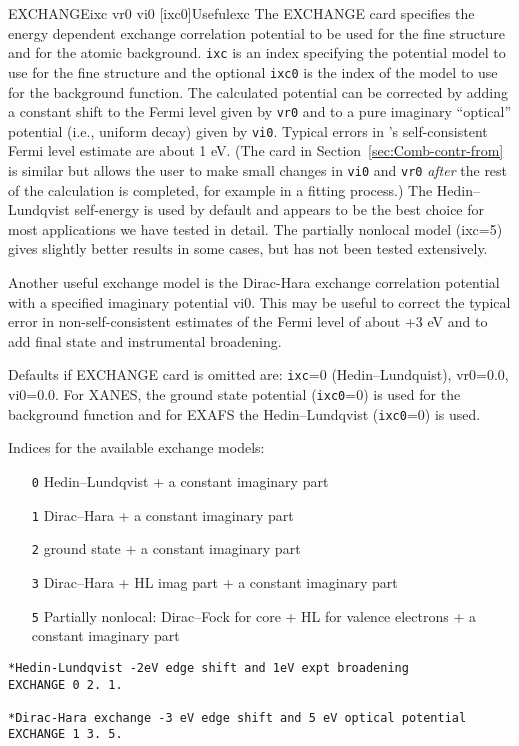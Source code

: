\documentclass[11pt,oneside]{report} %
\begin{document}
\begin{Card}{EXCHANGE}{ixc vr0 vi0 [ixc0]}{Useful}{exc}
  The EXCHANGE card specifies the energy dependent exchange
  correlation potential to be used for the fine structure and for the
  atomic background.  \texttt{ixc} is an index specifying the
  potential model to use for the fine structure and the optional
  \texttt{ixc0} is the index of the model to use for the background
  function.  The calculated potential can be corrected by adding a
  constant shift to the Fermi level given by \texttt{vr0} and to a
  pure imaginary ``optical'' potential (i.e., uniform decay)
  given by \texttt{vi0}. Typical errors in {\feff}'s self-consistent
  Fermi level estimate are about 1 eV.  (The
   card in Section~\ref{sec:Comb-contr-from} is
  similar but allows the user to make small changes in \texttt{vi0}
  and \texttt{vr0} {\it after}  the rest of the calculation is completed,
  for example in a fitting process.)  The
  Hedin--Lundqvist self-energy is used by default and appears to be the
  best choice for most applications we have tested in detail.  The
  partially nonlocal model (ixc=5) gives slightly better results in some
  cases, but has not been tested extensively.

  Another useful exchange model is the Dirac-Hara exchange correlation
  potential with a specified imaginary potential vi0.  This may be
  useful to correct the typical error in non-self-consistent estimates of
  the Fermi level of about +3 eV and to add final state and
  instrumental broadening.

  Defaults if EXCHANGE card is omitted are: \texttt{ixc}=0
  (Hedin--Lundquist), vr0=0.0, vi0=0.0.  For XANES, the ground state
  potential (\texttt{ixc0}=0) is used for the background function and
  for EXAFS the Hedin--Lundqvist (\texttt{ixc0}=0) is used.

  Indices for the available exchange models:
  \begin{itemize}
    \tightlist
  \item[ \texttt{0}\quad] Hedin--Lundqvist + a constant imaginary part
  \item[ \texttt{1}\quad] Dirac--Hara + a constant imaginary part
  \item[ \texttt{2}\quad] ground state + a constant imaginary part
  \item[ \texttt{3}\quad] Dirac--Hara + HL imag part + a constant
    imaginary part
  \item[ \texttt{5}\quad] Partially nonlocal: Dirac--Fock for core +
    HL for valence electrons + a constant imaginary part
  \end{itemize}
\begin{verbatim}
*Hedin-Lundqvist -2eV edge shift and 1eV expt broadening
EXCHANGE 0 2. 1.

*Dirac-Hara exchange -3 eV edge shift and 5 eV optical potential
EXCHANGE 1 3. 5.
\end{verbatim}


\end{Card}
\end{document}
